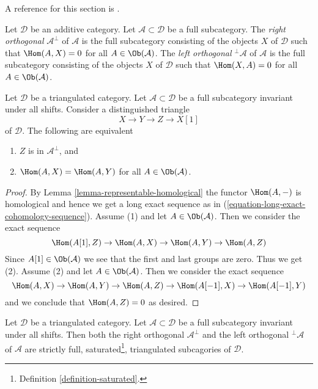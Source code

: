 \noindent
A reference for this section is \cite[Section 1]{Bondal-Kapranov}.

\begin{definition}
\label{definition-orthogonal}
Let $\mathcal{D}$ be an additive category. Let $\mathcal{A} \subset \mathcal{D}$
be a full subcategory. The {\it right orthogonal} $\mathcal{A}^\perp$ of
$\mathcal{A}$ is the full subcategory consisting of the objects $X$ of
$\mathcal{D}$ such that $\Hom(A, X) = 0$ for all $A \in \Ob(\mathcal{A})$.
The {\it left orthogonal} ${}^\perp\mathcal{A}$ of
$\mathcal{A}$ is the full subcategory consisting of the objects $X$ of
$\mathcal{D}$ such that $\Hom(X, A) = 0$ for all $A \in \Ob(\mathcal{A})$.
\end{definition}

\begin{lemma}
\label{lemma-pre-prepare-adjoint}
Let $\mathcal{D}$ be a triangulated category.
Let $\mathcal{A} \subset \mathcal{D}$
be a full subcategory invariant under all shifts.
Consider a distinguished triangle
$$
X \to Y \to Z \to X[1]
$$
of $\mathcal{D}$. The following are equivalent
\begin{enumerate}
\item $Z$ is in $\mathcal{A}^\perp$, and
\item $\Hom(A, X) = \Hom(A, Y)$ for all $A \in \Ob(\mathcal{A})$.
\end{enumerate}
\end{lemma}

\begin{proof}
By Lemma \ref{lemma-representable-homological} the functor
$\Hom(A, -)$ is homological and hence we get a long exact sequence
as in (\ref{equation-long-exact-cohomology-sequence}).
Assume (1) and let $A \in \Ob(\mathcal{A})$.
Then we consider the exact sequence
$$
\Hom(A[1], Z) \to \Hom(A, X) \to \Hom(A, Y) \to \Hom(A, Z)
$$
Since $A[1] \in \Ob(\mathcal{A})$
we see that the first and last groups are zero.
Thus we get (2). Assume (2) and let $A \in \Ob(\mathcal{A})$.
Then we consider the exact sequence
$$
\Hom(A, X) \to \Hom(A, Y) \to \Hom(A, Z) \to \Hom(A[-1], X) \to \Hom(A[-1], Y)
$$
and we conclude that $\Hom(A, Z) = 0$ as desired.
\end{proof}

\begin{lemma}
\label{lemma-orthogonal-triangulated}
Let $\mathcal{D}$ be a triangulated category. Let
$\mathcal{A} \subset \mathcal{D}$ be a full subcategory invariant
under all shifts. Then both the right orthogonal $\mathcal{A}^\perp$ and
the left orthogonal ${}^\perp\mathcal{A}$ of $\mathcal{A}$
are strictly full, saturated\footnote{Definition \ref{definition-saturated}.},
triangulated subcagories of $\mathcal{D}$.
\end{lemma}

